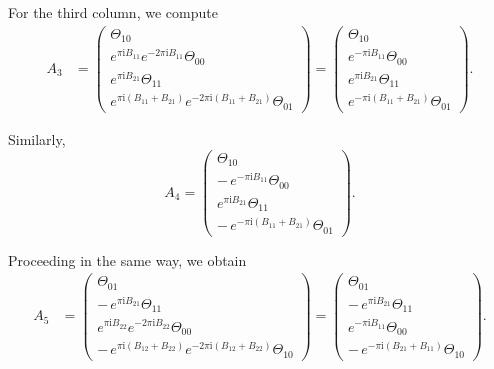 \documentclass{amsart}
\numberwithin{equation}{hw}
\begin{document}
For the third column, we compute
\begin{align}
A_3
&=
\begin{pmatrix}
\Theta_{10}\\[4pt]
e^{\pi\mathrm{i}B_{11}}
e^{-2\pi\mathrm{i}B_{11}}
\Theta_{00}\\[4pt]
e^{\pi\mathrm{i}B_{21}}
\Theta_{11}\\[4pt]
e^{\pi\mathrm{i}(B_{11}+B_{21})}
e^{-2\pi\mathrm{i}(B_{11}+B_{21})}
\Theta_{01}
\end{pmatrix}
=
\begin{pmatrix}
\Theta_{10}\\[4pt]
e^{-\pi\mathrm{i}B_{11}}
\Theta_{00}\\[4pt]
e^{\pi\mathrm{i}B_{21}}
\Theta_{11}\\[4pt]
e^{-\pi\mathrm{i}(B_{11}+B_{21})}
\Theta_{01}
\end{pmatrix}.
\label{eq:A3}
\end{align}

Similarly,
\begin{equation}
A_4
=
\begin{pmatrix}
\Theta_{10}\\[4pt]
-\,e^{-\pi\mathrm{i}B_{11}}
\Theta_{00}\\[4pt]
e^{\pi\mathrm{i}B_{21}}
\Theta_{11}\\[4pt]
-\,e^{-\pi\mathrm{i}(B_{11}+B_{21})}
\Theta_{01}
\end{pmatrix}.
\label{eq:A4}
\end{equation}

Proceeding in the same way, we obtain
\begin{align}
A_5
&=
\begin{pmatrix}
\Theta_{01}\\[4pt]
-\,e^{\pi\mathrm{i}B_{21}}
\Theta_{11}\\[4pt]
e^{\pi\mathrm{i}B_{22}}
e^{-2\pi\mathrm{i}B_{22}}
\Theta_{00}\\[4pt]
-\,e^{\pi\mathrm{i}(B_{12}+B_{22})}
e^{-2\pi\mathrm{i}(B_{12}+B_{22})}
\Theta_{10}
\end{pmatrix}
=
\begin{pmatrix}
\Theta_{01}\\[4pt]
-\,e^{\pi\mathrm{i}B_{21}}
\Theta_{11}\\[4pt]
e^{-\pi\mathrm{i}B_{11}}
\Theta_{00}\\[4pt]
-\,e^{-\pi\mathrm{i}(B_{21}+B_{11})}
\Theta_{10}
\end{pmatrix}.
\label{eq:A5}
\end{align}
\end{document}
